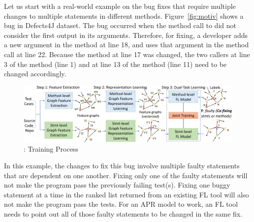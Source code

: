 Let us start with a real-world example on the bug fixes that
require multiple changes to multiple statements in different methods.
Figure~\ref{fig:motiv} shows a bug in Defects4J dataset. The bug
occurred when the method call to  did not
consider the first output in its arguments. Therefore, for fixing, a
developer adds a new argument in the method  at line
18, and uses that argument in the method call  at line 22. Because the method  at
line 17 was changed, the two callers at line 3 of the method
 (line 1) and at line 13 of the method 
(line 11) need to be changed accordingly.




\begin{figure}[t]
	\centering
	\includegraphics[width=5.65in]{graphs/overview-training-4.png} %
        \vspace{-8pt}
	\caption{{\tool}: Training Process}
        \label{train-overview}
\end{figure}

\vspace{3pt}
 In this
example, the changes to fix this bug involve multiple faulty
statements that are dependent on one another. Fixing only one of the
faulty statements will not make the program pass the previously
failing test(s). Fixing one buggy statement at a time in the ranked
list returned from an existing FL tool will also not make the program
pass the tests. For an APR model to work, an FL tool needs to point
out all of those faulty statements to be changed in the same fix.

